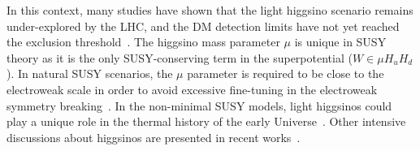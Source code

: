 \documentclass[letterpaper,11pt]{article}
\begin{document}
\par In this context, many studies have shown that the light higgsino scenario remains under-explored by the LHC, and the DM detection limits have not yet reached the exclusion threshold~\cite{Martin:2024ytt, Martin:2024pxx}. 
The higgsino mass parameter $\mu$ is unique in SUSY theory as it is the only SUSY-conserving term in the superpotential ($W \in \mu H_u H_d $).
In natural SUSY scenarios, the $\mu$ parameter is required to be close to the electroweak scale in order to avoid excessive fine-tuning in the electroweak symmetry breaking~\cite{Feng:2013pwa, vanBeekveld:2019tqp, Barbieri:1987fn, Arvanitaki:2013yja, Evans:2013jna, Baer:2014ica}. 
In the non-minimal SUSY models, light higgsinos could play a unique role in the thermal history of the early Universe~\cite{Cao:2018rix, Cao:2019qng, Cao:2019evo, Cao:2021lmj, Cao:2021tuh, Yue:2025dqe, Liang:2025utb, Dong:2024juh, Wang:2024ozr, Chakraborti:2024pdn, Dai:2023pli, Khan:2025yit}. Other intensive discussions about higgsinos are presented in recent works~\cite{Araz:2025bww, Zhou:2025xol, Carpenter:2023agq, Baer:2025zqt, Baer:2024hqm, Nagata:2025ycf, Baer:2024tfo, Fowlie:2024nhs, Li:2023hey, VanBeekveld:2021tgn, Baer:2020sgm, Bae:2019dgg, Baer:2017pba, Wang:2016otm, Fan:2024jvz, Du:2023qvj, Wang:2023bmh, Li:2022zap, Wang:2022rfd, Wang:2018idz, Khan:2025azf, Yin:2024bwv, Fu:2023sfk, Agin:2024yfs, Rodd:2024qsi, Liu:2020muv, Liu:2020ctf, Zhao:2022pnv}. 
\end{document}
